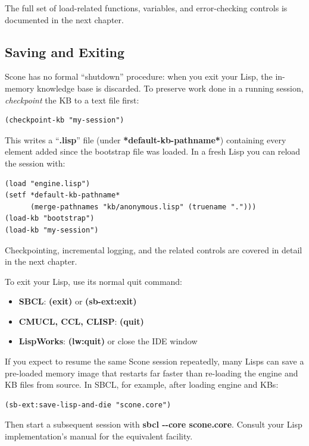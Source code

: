 \documentclass[titlepage,twoside,openright,11pt]{article}
\providecommand{\tightlist}{%
  \setlength{\itemsep}{0pt}\setlength{\parskip}{0pt}}
\begin{document}
The full set of load-related functions, variables, and error-checking
controls is documented in the next chapter.

\subsection{Saving and Exiting}\label{saving-and-exiting}

Scone has no formal ``shutdown'' procedure: when you exit your Lisp,
the in-memory knowledge base is discarded. To preserve work done in a
running session, \emph{checkpoint} the KB to a text file first:

\begin{verbatim}
(checkpoint-kb "my-session")
\end{verbatim}

This writes a ``\textbf{.lisp}'' file (under
\textbf{*default-kb-pathname*}) containing every element added since
the bootstrap file was loaded. In a fresh Lisp you can reload the
session with:

\begin{verbatim}
(load "engine.lisp")
(setf *default-kb-pathname*
      (merge-pathnames "kb/anonymous.lisp" (truename ".")))
(load-kb "bootstrap")
(load-kb "my-session")
\end{verbatim}

Checkpointing, incremental logging, and the related controls are
covered in detail in the next chapter.

To exit your Lisp, use its normal quit command:

\begin{itemize}
\tightlist
\item
  \textbf{SBCL}: \textbf{(exit)} or \textbf{(sb-ext:exit)}
\item
  \textbf{CMUCL, CCL, CLISP}: \textbf{(quit)}
\item
  \textbf{LispWorks}: \textbf{(lw:quit)} or close the IDE window
\end{itemize}

If you expect to resume the same Scone session repeatedly, many Lisps
can save a pre-loaded memory image that restarts far faster than
re-loading the engine and KB files from source. In SBCL, for example,
after loading engine and KBs:

\begin{verbatim}
(sb-ext:save-lisp-and-die "scone.core")
\end{verbatim}

Then start a subsequent session with \textbf{sbcl
-\/-core scone.core}. Consult your Lisp implementation's manual for
the equivalent facility.
\end{document}
